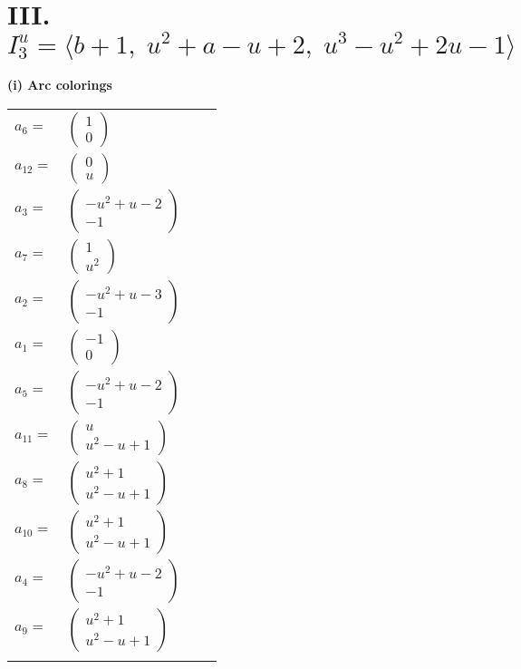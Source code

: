\documentclass[1p]{elsarticle_modified}
\theoremstyle{definition}
\begin{document}
\centering \section*{III. $I^u_{3}= \langle b+1,\;u^2+a- u+2,\;u^3- u^2+2 u-1 \rangle$}
\flushleft \textbf{(i) Arc colorings}\\
\begin{tabular}{m{7pt} m{180pt} m{7pt} m{180pt} }
\flushright $a_{6}=$&$\begin{pmatrix}1\\0\end{pmatrix}$ \\
\flushright $a_{12}=$&$\begin{pmatrix}0\\u\end{pmatrix}$ \\
\flushright $a_{3}=$&$\begin{pmatrix}- u^2+u-2\\-1\end{pmatrix}$ \\
\flushright $a_{7}=$&$\begin{pmatrix}1\\u^2\end{pmatrix}$ \\
\flushright $a_{2}=$&$\begin{pmatrix}- u^2+u-3\\-1\end{pmatrix}$ \\
\flushright $a_{1}=$&$\begin{pmatrix}-1\\0\end{pmatrix}$ \\
\flushright $a_{5}=$&$\begin{pmatrix}- u^2+u-2\\-1\end{pmatrix}$ \\
\flushright $a_{11}=$&$\begin{pmatrix}u\\u^2- u+1\end{pmatrix}$ \\
\flushright $a_{8}=$&$\begin{pmatrix}u^2+1\\u^2- u+1\end{pmatrix}$ \\
\flushright $a_{10}=$&$\begin{pmatrix}u^2+1\\u^2- u+1\end{pmatrix}$ \\
\flushright $a_{4}=$&$\begin{pmatrix}- u^2+u-2\\-1\end{pmatrix}$ \\
\flushright $a_{9}=$&$\begin{pmatrix}u^2+1\\u^2- u+1\end{pmatrix}$\\&\end{tabular}
\end{document}
